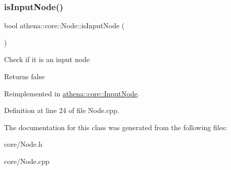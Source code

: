 \subsubsection{\texorpdfstring{is\+Input\+Node()}{isInputNode()}}
{\footnotesize\ttfamily bool athena\+::core\+::\+Node\+::is\+Input\+Node (\begin{DoxyParamCaption}{ }\end{DoxyParamCaption})\hspace{0.3cm}{\ttfamily [virtual]}}

Check if it is an input node \begin{DoxyReturn}{Returns}
false 
\end{DoxyReturn}


Reimplemented in \mbox{\hyperlink{classathena_1_1core_1_1_input_node_a2548b569a336b75c0005295833052979}{athena\+::core\+::\+Input\+Node}}.



Definition at line 24 of file Node.\+cpp.



The documentation for this class was generated from the following files\+:\begin{DoxyCompactItemize}
\item 
core/Node.\+h\item 
core/Node.\+cpp\end{DoxyCompactItemize}
